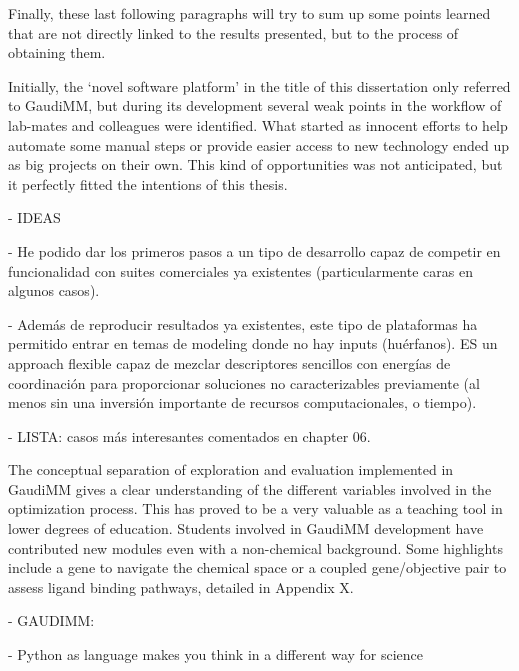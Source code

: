 
Finally, these last following paragraphs will try to sum up some points learned that are not directly linked to the results presented, but to the process of obtaining them.

Initially, the ‘novel software platform’ in the title of this dissertation only referred to GaudiMM, but during its development several weak points in the workflow of lab-mates and colleagues were identified. What started as innocent efforts to help automate some manual steps or provide easier access to new technology ended up as big projects on their own. This kind of opportunities was not anticipated, but it perfectly fitted the intentions of this thesis.

- IDEAS

	- He podido dar los primeros pasos a un tipo de desarrollo capaz de competir en funcionalidad con suites comerciales ya existentes (particularmente caras en algunos casos).

	- Además de reproducir resultados ya existentes, este tipo de plataformas ha permitido entrar en temas de modeling donde no hay inputs (huérfanos). ES un approach flexible capaz de mezclar descriptores sencillos con energías de coordinación para proporcionar soluciones no caracterizables previamente (al menos sin una inversión importante de recursos computacionales, o tiempo).

	- LISTA: casos más interesantes comentados en chapter 06.

	The conceptual separation of exploration and evaluation implemented in GaudiMM gives a clear understanding of the different variables involved in the optimization process. This has proved to be a very valuable as a teaching tool in lower degrees of education. Students involved in GaudiMM development have contributed new modules even with a non-chemical background. Some highlights include a gene to navigate the chemical space or a coupled gene/objective pair to assess ligand binding pathways, detailed in Appendix X.

- GAUDIMM:


-	Python as language makes you think in a different way for science